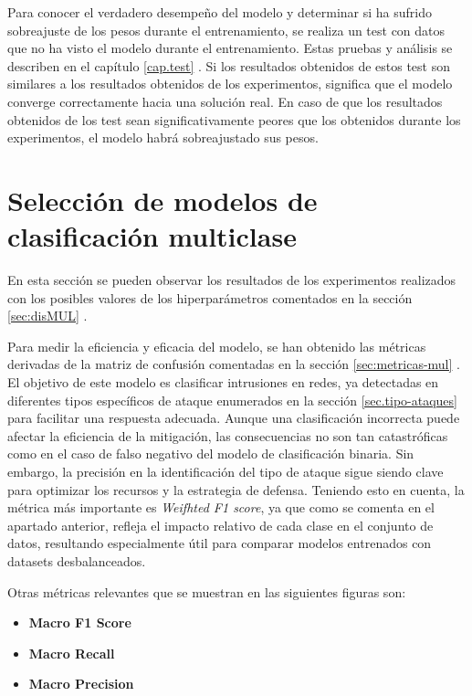 Para conocer el verdadero desempeño del modelo y determinar si ha sufrido sobreajuste de los pesos durante el entrenamiento, se realiza un test con datos que no ha visto el modelo durante el entrenamiento. Estas pruebas y análisis se describen en el capítulo \ref{cap.test} . Si los resultados obtenidos de estos test son similares a los resultados obtenidos de los experimentos, significa que el modelo converge correctamente hacia una solución real. En caso de que los resultados obtenidos de los test sean significativamente peores que los obtenidos durante los experimentos, el modelo habrá sobreajustado sus pesos. 



\section{Selección de modelos de clasificación multiclase}
En esta sección se pueden observar los resultados de los experimentos realizados con los posibles valores de los hiperparámetros comentados en la sección \ref{sec:disMUL} .

Para medir la eficiencia y eficacia del modelo, se han obtenido las métricas derivadas de la matriz de confusión comentadas en la sección \ref{sec:metricas-mul} . El objetivo de este modelo es clasificar intrusiones en redes, ya detectadas en diferentes tipos específicos de ataque enumerados en la sección \ref{sec.tipo-ataques} para facilitar una respuesta adecuada. Aunque una clasificación incorrecta puede afectar la eficiencia de la mitigación, las consecuencias no son tan catastróficas como en el caso de falso negativo del modelo de clasificación binaria. Sin embargo, la precisión en la identificación del tipo de ataque sigue siendo clave para optimizar los recursos y la estrategia de defensa.
Teniendo esto en cuenta, la métrica más importante es \textit{Weifhted F1 score}, ya que como se comenta en el apartado anterior, refleja el impacto relativo de cada clase en el conjunto de datos, resultando especialmente útil para comparar modelos entrenados con datasets desbalanceados.

Otras métricas relevantes que se muestran en las siguientes figuras son:
\begin{itemize}
	\item \textbf{ Macro F1 Score}%
	\item \textbf{ Macro Recall}%
	\item \textbf{Macro Precision}%
\end{itemize}

